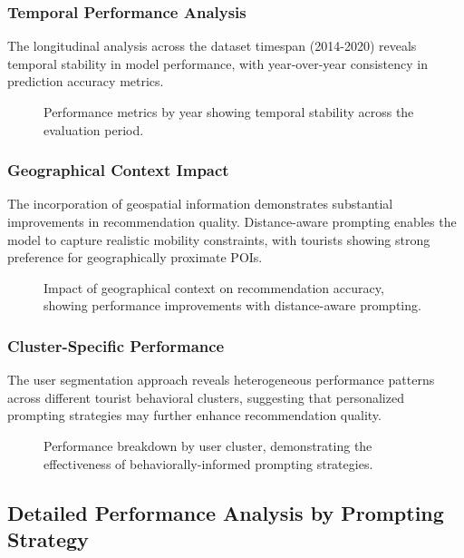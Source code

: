 \subsubsection{Temporal Performance Analysis}

The longitudinal analysis across the dataset timespan (2014-2020) reveals temporal stability in model performance, with year-over-year consistency in prediction accuracy metrics.

\begin{figure}[h]
\centering
\caption{Performance metrics by year showing temporal stability across the evaluation period.}
\label{fig:temporal_performance}
\end{figure}

\subsubsection{Geographical Context Impact}

The incorporation of geospatial information demonstrates substantial improvements in recommendation quality. Distance-aware prompting enables the model to capture realistic mobility constraints, with tourists showing strong preference for geographically proximate POIs.

\begin{figure}[h]
\centering
\caption{Impact of geographical context on recommendation accuracy, showing performance improvements with distance-aware prompting.}
\label{fig:geographical_impact}
\end{figure}

\subsubsection{Cluster-Specific Performance}

The user segmentation approach reveals heterogeneous performance patterns across different tourist behavioral clusters, suggesting that personalized prompting strategies may further enhance recommendation quality.

\begin{figure}[h]
\centering
\caption{Performance breakdown by user cluster, demonstrating the effectiveness of behaviorally-informed prompting strategies.}
\label{fig:cluster_performance}
\end{figure}

\subsection{Detailed Performance Analysis by Prompting Strategy}

